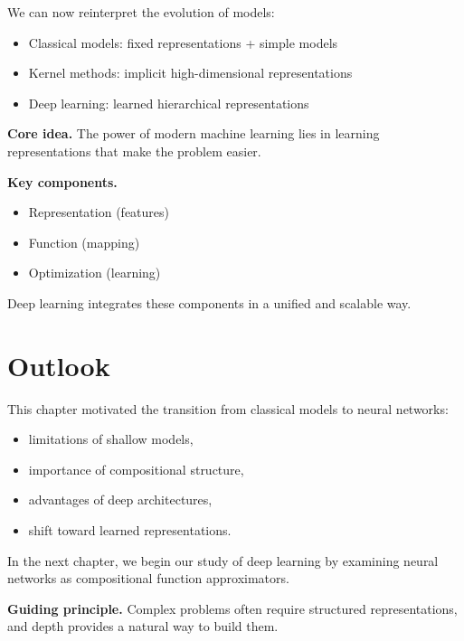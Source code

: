 We can now reinterpret the evolution of models:

\begin{itemize}
    \item Classical models: fixed representations + simple models
    \item Kernel methods: implicit high-dimensional representations
    \item Deep learning: learned hierarchical representations
\end{itemize}

\medskip

\noindent
\textbf{Core idea.}  
The power of modern machine learning lies in learning representations that make the problem easier.

\medskip

\noindent
\textbf{Key components.}
\begin{itemize}
    \item Representation (features)
    \item Function (mapping)
    \item Optimization (learning)
\end{itemize}

\medskip

\noindent
Deep learning integrates these components in a unified and scalable way.

\section{Outlook}

This chapter motivated the transition from classical models to neural networks:
\begin{itemize}
    \item limitations of shallow models,
    \item importance of compositional structure,
    \item advantages of deep architectures,
    \item shift toward learned representations.
\end{itemize}

\medskip

In the next chapter, we begin our study of deep learning by examining neural networks as compositional function approximators.

\medskip

\noindent
\textbf{Guiding principle.}  
Complex problems often require structured representations, and depth provides a natural way to build them.